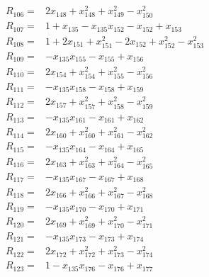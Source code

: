 \begin{align*}
R_{106} ={}& 2x_{148} + x_{148}^{2} + x_{149}^{2} - x_{150}^{2} \\[4pt]
R_{107} ={}& 1 + x_{135} - x_{135}x_{152} - x_{152} + x_{153} \\[4pt]
R_{108} ={}& 1 + 2x_{151} + x_{151}^{2} - 2x_{152} + x_{152}^{2} - x_{153}^{2} \\[4pt]
R_{109} ={}& -x_{135}x_{155} - x_{155} + x_{156} \\[4pt]
R_{110} ={}& 2x_{154} + x_{154}^{2} + x_{155}^{2} - x_{156}^{2} \\[4pt]
R_{111} ={}& -x_{135}x_{158} - x_{158} + x_{159} \\[4pt]
R_{112} ={}& 2x_{157} + x_{157}^{2} + x_{158}^{2} - x_{159}^{2} \\[4pt]
R_{113} ={}& -x_{135}x_{161} - x_{161} + x_{162} \\[4pt]
R_{114} ={}& 2x_{160} + x_{160}^{2} + x_{161}^{2} - x_{162}^{2} \\[4pt]
R_{115} ={}& -x_{135}x_{164} - x_{164} + x_{165} \\[4pt]
R_{116} ={}& 2x_{163} + x_{163}^{2} + x_{164}^{2} - x_{165}^{2} \\[4pt]
R_{117} ={}& -x_{135}x_{167} - x_{167} + x_{168} \\[4pt]
R_{118} ={}& 2x_{166} + x_{166}^{2} + x_{167}^{2} - x_{168}^{2} \\[4pt]
R_{119} ={}& -x_{135}x_{170} - x_{170} + x_{171} \\[4pt]
R_{120} ={}& 2x_{169} + x_{169}^{2} + x_{170}^{2} - x_{171}^{2} \\[4pt]
R_{121} ={}& -x_{135}x_{173} - x_{173} + x_{174} \\[4pt]
R_{122} ={}& 2x_{172} + x_{172}^{2} + x_{173}^{2} - x_{174}^{2} \\[4pt]
R_{123} ={}& 1 - x_{135}x_{176} - x_{176} + x_{177} \\[4pt]

\end{align*}
